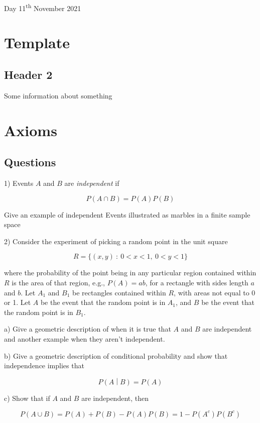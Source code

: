 Day 11\textsuperscript{th} November 2021

\section{Template}\label{template}

\subsection{Header 2}\label{header-2}

Some information about something

\section{Axioms}\label{axioms}

\subsection{Questions}\label{questions}

1) Events \(A\) and \(B\) are \emph{independent} if

\[P(A \cap B) = P(A)P(B)\]

Give an example of independent Events illustrated as marbles in a finite
sample space

2) Consider the experiment of picking a random point in the unit square

\[R = \{(x,y)\ :\ 0 < x < 1,\ 0 < y < 1\}\]

where the probability of the point being in any particular region
contained within \(R\) is the area of that region, e.g., \(P(A) = ab\),
for a rectangle with sides length \(a\) and \(b\). Let \(A_{1}\) and
\(B_{1}\) be rectangles contained within \(R\), with areas not equal to
0 or 1. Let \(A\) be the event that the random point is in \(A_{1}\),
and \(B\) be the event that the random point is in \(B_{1}\).

a) Give a geometric description of when it is true that \(A\) and \(B\)
are independent and another example when they aren't independent.

b) Give a geometric description of conditional probability and show that
independence implies that

\[P\left( A \middle| B \right) = P(A)\]

c) Show that if \(A\) and \(B\) are independent, then

\[P(A \cup B) = P(A) + P(B) - P(A)P(B) = 1 - P\left( A^{c} \right)P(B^{c})\]

